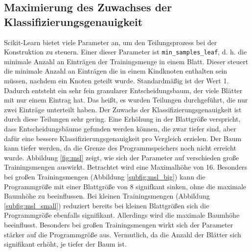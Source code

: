 \subsection{Maximierung des Zuwachses der Klassifizierungsgenauigkeit}
Scikit-Learn bietet viele Parameter an, um den Teilungsprozess bei der Konstruktion zu steuern. Einer dieser Parameter ist \texttt{min\_samples\_leaf}, d. h. die minimale Anzahl an Einträgen der Trainingsmenge
in einem Blatt. Dieser steuert die minimale Anzahl an Einträgen die in einem Kindknoten enthalten sein müssen, nachdem ein Knoten geteilt wurde. Standardmäßig ist der Wert 1. Dadurch entsteht ein sehr fein granularer
Entscheidungsbaum, der viele Blätter mit nur einem Eintrag hat. Das heißt, es wurden Teilungen durchgeführt, die nur zwei Einträge unterteilt haben. Der Zuwachs der Klassifizierungsgenauigkeit ist durch diese
Teilungen sehr gering. Eine Erhöhung in der Blattgröße verspricht, dass Entscheidungsbäume gefunden werden können, die zwar tiefer sind, aber dafür eine bessere Klassifizierungsgenauigkeit pro Vergleich erzielen.
Der Baum kann tiefer werden, da die Grenze des Programmspeichers noch nicht erreicht wurde.
\newline
\newline
Abbildung \ref{fig:msl} zeigt, wie sich der Parameter auf verschieden große Trainingsmengen auswirkt. Betrachtet wird eine Maximalhöhe von 16. Besonders bei großen Trainingsmengen (Abbildung \ref{subfig:msl_big})
kann die Programmgröße mit einer Blattgröße von 8 signifkant sinken, ohne die maximale Baumhöhe zu beeinflussen. Bei kleinen Trainingsmengen (Abbildung \ref{subfig:msl_small}) reduziert bereits bei kleinen Blattgrößen
sich die Programmgröße ebenfalls signifikant. Allerdings wird die maximale Baumhöhe beeinflusst. Besonders bei großen Trainingsmengen wirkt sich der Parameter stärker auf die Programmgröße aus.
Vermutlich, da die Anzahl der Blätter sich signifikant erhöht, je tiefer der Baum ist.
